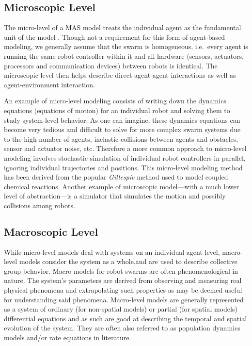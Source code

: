 \documentclass[12pt]{book}
\begin{document}
\subsection{Microscopic Level}
The micro-level of a MAS model treats the individual agent as the fundamental unit of the model \cite{Lerman2001a}. Though not a requirement for this form of agent-based modeling, we generally assume that the swarm is homogeneous, i.e.\ every agent is running the same robot controller within it and all hardware (sensors, actuators, processors and communication devices) between robots is identical. The microscopic level then helps describe direct agent-agent interactions as well as agent-environment interaction. 

An example of micro-level modeling consists of writing down the dynamics equations (equations of motion) for an individual robot and solving them to study system-level behavior. As one can imagine, these dynamics equations can become very tedious and difficult to solve for more complex swarm systems due to the high number of agents, inelastic collisions between agents and obstacles, sensor and actuator noise, etc. Therefore a more common approach to micro-level modeling involves stochastic simulation of individual robot controllers in parallel, ignoring individual trajectories and positions. This micro-level modeling method has been derived from the popular \emph{Gillespie} method \cite{Gillespie1976,Gillespie1977} used to model coupled chemical reactions. Another example of microscopic model---with a much lower level of abstraction---is a simulator that simulates the motion and possibly collisions among robots. 


\subsection{Macroscopic Level}
While micro-level models deal with systems on an individual agent level, macro-level models consider the system as a whole,and are used to describe collective group behavior. Macro-models for robot swarms are often phenomenological in nature. The system's parameters are derived from observing and measuring real physical phenomena and extrapolating such properties as may be deemed useful for understanding said phenomena. Macro-level models are generally represented as a system of ordinary (for non-spatial models) or partial (for spatial models) differential equations and as such are good at describing the temporal and spatial evolution of the system. They are often also referred to as population dynamics models and/or rate equations in literature.
\end{document}
